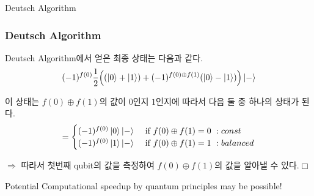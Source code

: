 \documentclass[9pt]{beamer}
\begin{document}
\begin{section}{Deutsch Algorithm}
\begin{frame}
        \end{frame}

        \begin{frame}
            \frametitle{Deutsch Algorithm}
            Deutsch Algorithm에서 얻은 최종 상태는 다음과 같다.
            $$ (-1)^{f(0)} \frac{1}{2} \Big((\ket 0 + \ket 1) + (-1)^{f(0) \oplus f(1)}(\ket 0 - \ket 1)\Big) \ket - $$

            이 상태는 $f(0) \oplus f(1)$의 값이 $0$인지 $1$인지에 따라서 다음 둘 중 하나의 상태가 된다.
            $$= \begin{cases} (-1)^{f(0)}\ket 0 \ket - & \text { if } f(0)\oplus f(1)=0\ :const \\ (-1)^{f(0)}\ket 1 \ket - & \text { if } f(0)\oplus f(1)=1\ :balanced\end{cases}$$
            
            \vspace{0.5cm}
            $\Rightarrow$ 따라서 첫번째 qubit의 값을 측정하여 $f(0)\oplus f(1)$의 값을 알아낼 수 있다.$\Box$
            
            \vspace{0.5cm}
            \begin{block}{Potential}
                Computational speedup by quantum principles may be possible!
            \end{block}
        \end{frame}
    \end{section}
\end{document}
